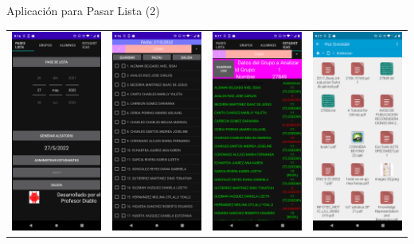 \begin{frame}{Aplicación para Pasar Lista (2)}
\begin{center}
	\begin{tabular}{cccc}
		\includegraphics[width=0.20\linewidth]{2022_AppPaseLista/figs/PaseLista0.png} &
		\includegraphics[width=0.20\linewidth]{2022_AppPaseLista/figs/PaseLista1.png} & 		 		
		\includegraphics[width=0.20\linewidth]{2022_AppPaseLista/figs/PaseLista2.png} & 		
		\includegraphics[width=0.20\linewidth]{2022_AppPaseLista/figs/PaseLista3.png} \\
	\end{tabular}
\end{center}
\end{frame}



